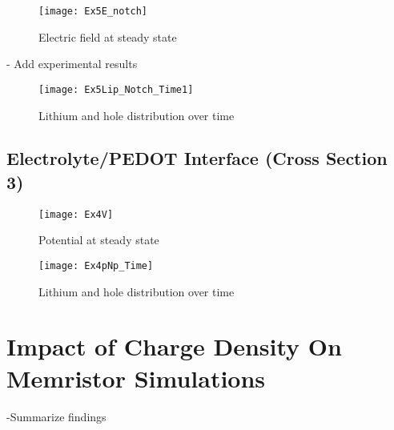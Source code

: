 \begin{figure}[!htp]
\centering
\texttt{[image: Ex5E\_notch]}
\caption{Electric field at steady state} 
\label{MemEss_notch}
\end{figure}

- Add experimental results 

\begin{landscape}
\begin{figure}[!htp]
\centering
\texttt{[image: Ex5Lip\_Notch\_Time1]}
\caption{Lithium and hole distribution over time} 
\label{}
\end{figure}
\end{landscape}


\clearpage
\subsection{Electrolyte/PEDOT Interface (Cross Section 3) }

\begin{figure}[!htp]
\centering
\texttt{[image: Ex4V]}
\caption{Potential at steady state} 
\label{}
\end{figure}



\begin{landscape}
\begin{figure}[!htp]
\centering
\texttt{[image: Ex4pNp\_Time]}
\caption{Lithium and hole distribution over time} 
\label{}
\end{figure}
\end{landscape}


\section{Impact of Charge Density On Memristor Simulations}
-Summarize findings

